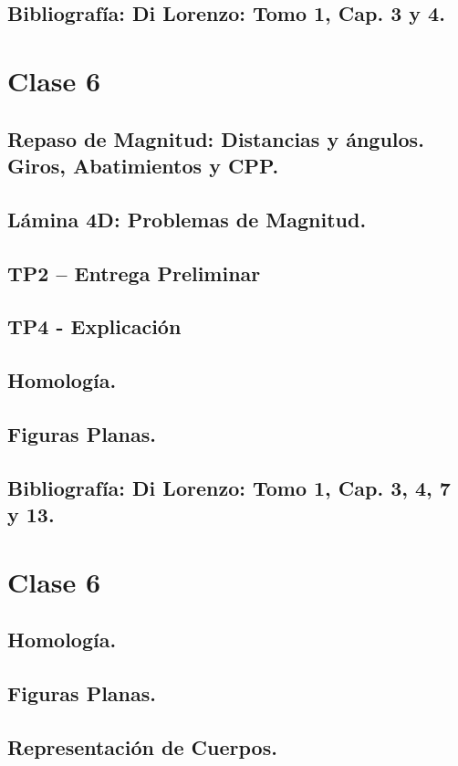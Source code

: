 \documentclass[12pt]{book}
\begin{document}
\section{Bibliografía: Di Lorenzo: Tomo 1, Cap. 3 y 4.}


\chapter{Clase 6 }
\section{Repaso de Magnitud: Distancias y ángulos. Giros, Abatimientos y CPP.}
\section{Lámina 4D: Problemas de Magnitud.}
\section{TP2 – Entrega Preliminar}
\section{TP4 - Explicación}
\section{Homología.}
\section{Figuras Planas.}
\section{Bibliografía: Di Lorenzo: Tomo 1, Cap. 3, 4, 7 y 13.}

\chapter{Clase 6 }
\section{Homología.}
\section{Figuras Planas.}
\section{Representación de Cuerpos.}
\end{document}
